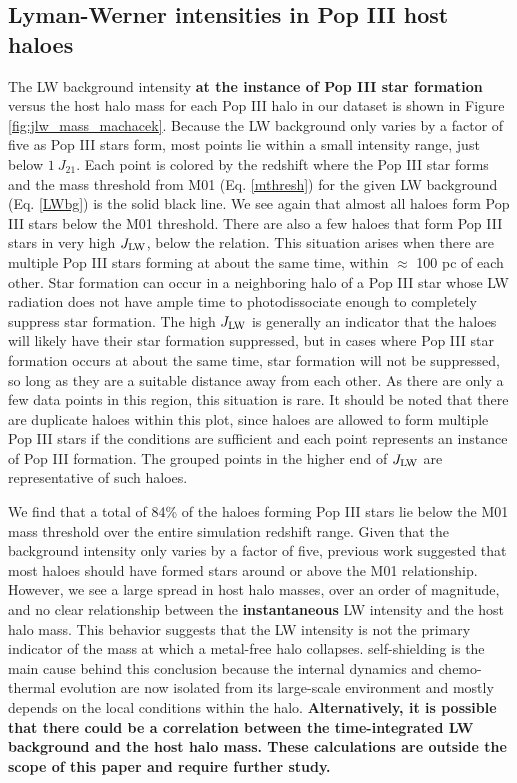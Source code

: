 \documentclass[fleqn,usenatbib]{mnras}
\begin{document}
\subsection{Lyman-Werner intensities in Pop III host haloes}

The LW background intensity \textbf{at the instance of Pop III star formation} versus the host halo mass for each Pop III halo in our dataset is shown in Figure \ref{fig:jlw_mass_machacek}. Because the LW background only varies by a factor of five as Pop III stars form, most points lie within a small intensity range, just below $1~J_{21}$. Each point is colored by the redshift where the Pop III star forms and the mass threshold from M01 (Eq. \ref{mthresh}) for the given LW background (Eq. \ref{LWbg}) is the solid black line. We see again that almost all haloes form Pop III stars below the M01 threshold. There are also a few haloes that form Pop III stars in very high $J_{\rm LW}$, below the relation. This situation arises when there are multiple Pop III stars forming at about the same time, within $\approx$ 100 pc of each other. Star formation can occur in a neighboring halo of a Pop III star whose LW radiation does not have ample time to photodissociate enough \hh{} to completely suppress star formation. The high $J_{\rm LW}$ is generally an indicator that the haloes will likely have their star formation suppressed, but in cases where Pop III star formation occurs at about the same time, star formation will not be suppressed, so long as they are a suitable distance away from each other. As there are only a few data points in this region, this situation is rare. It should be noted that there are duplicate haloes within this plot, since haloes are allowed to form multiple Pop III stars if the conditions are sufficient and each point represents an instance of Pop III formation. The grouped points in the higher end of $J_{\rm LW}$ are representative of such haloes. 

We find that a total of 84\% of the haloes forming Pop III stars lie below the M01 mass threshold over the entire simulation redshift range.  Given that the background intensity only varies by a factor of five, previous work suggested that most haloes should have formed stars around or above the M01 relationship.  However, we see a large spread in host halo masses, over an order of magnitude, and no clear relationship between the \textbf{instantaneous} LW intensity and the host halo mass. This behavior suggests that the LW intensity is not the primary indicator of the mass at which a metal-free halo collapses. \hh{} self-shielding is the main cause behind this conclusion because the internal dynamics and chemo-thermal evolution are now isolated from its large-scale environment and mostly depends on the local conditions within the halo. \textbf{Alternatively, it is possible that there could be a correlation between the time-integrated LW background and the host halo mass. These calculations are outside the scope of this paper and require further study.}
\end{document}
